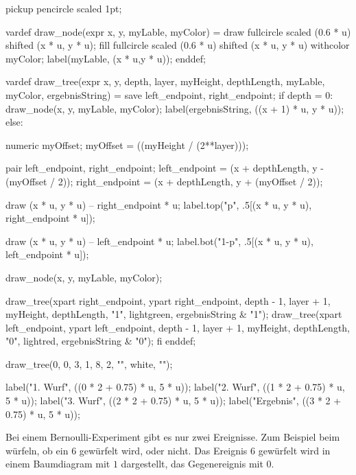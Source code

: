 pickup pencircle scaled 1pt;

vardef draw_node(expr x, y, myLable, myColor) =
	draw fullcircle scaled (0.6 * u) shifted (x * u, y * u);
	fill fullcircle scaled (0.6 * u) shifted (x * u, y * u) withcolor myColor;
	label(myLable, (x * u,y * u));
enddef;

vardef draw_tree(expr x, y, depth, layer, myHeight, depthLength, myLable, myColor, ergebnisString) =
	save left_endpoint, right_endpoint;
  if depth = 0:
	draw_node(x, y, myLable, myColor);
	label(ergebnisString, ((x + 1) * u, y * u));
  else:

	numeric myOffset;
	myOffset = ((myHeight / (2**layer)));

    pair left_endpoint, right_endpoint;
    left_endpoint = (x + depthLength, y - (myOffset / 2));
    right_endpoint = (x + depthLength, y + (myOffset / 2));
    
	draw (x * u, y * u) -- right_endpoint * u;
	label.top("p", .5[(x * u, y * u), right_endpoint * u]);

	draw (x * u, y * u) -- left_endpoint * u;
	label.bot("1-p", .5[(x * u, y * u), left_endpoint * u]);

	draw_node(x, y, myLable, myColor);

	draw_tree(xpart right_endpoint, ypart right_endpoint, depth - 1, layer + 1, myHeight, depthLength, "1", lightgreen, ergebnisString & "1");
	draw_tree(xpart left_endpoint, ypart left_endpoint, depth - 1, layer + 1, myHeight, depthLength, "0", lightred, ergebnisString & "0");
  fi
enddef;

draw_tree(0, 0, 3, 1, 8, 2, "", white, "");

label("1. Wurf",	((0 * 2 + 0.75) * u, 5 * u));
label("2. Wurf",	((1 * 2 +	0.75) * u, 5 * u));
label("3. Wurf",	((2 * 2 +	0.75) * u, 5 * u));
label("Ergebnis",	((3 * 2	+ 0.75) * u, 5 * u));

\stopMPpage
\stopbuffer


Bei einem Bernoulli-Experiment gibt es nur zwei Ereignisse. Zum Beispiel beim würfeln, ob ein
$6$ gewürfelt wird, oder nicht. Das Ereignis $6$ gewürfelt wird in einem
Baumdiagram mit $1$ dargestellt, das Gegenereignis mit $0$.

